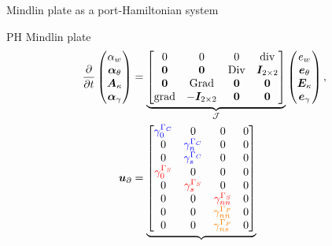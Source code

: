 \documentclass[aspectratio=169]{ISAE-Beamer}
\DeclareMathOperator*{\grad}{grad}
\DeclareMathOperator*{\Grad}{Grad}
\DeclareMathOperator*{\Div}{Div}
\renewcommand{\div}{\operatorname{div}}
\begin{document}
\begin{frame}{Mindlin plate as a port-Hamiltonian system}
	\begin{block}{PH Mindlin plate}
		\small
		\setlength{\abovedisplayskip}{1pt}
		\setlength{\belowdisplayskip}{1pt}
		\begin{equation*}
		\begin{aligned}
		\displaystyle
		\diffp{}{t}
		\begin{pmatrix}
		\alpha_w \\
		\bm\alpha_\theta \\
		\bm{A}_\kappa \\
		\bm\alpha_{\gamma} \\
		\end{pmatrix} &= 
		\underbrace{\begin{bmatrix}
			0  & 0  & 0  & \div \\
			\bm{0} & \bm{0} &  \Div & \bm{I}_{2 \times 2}\\
			\bm{0}  & \Grad  & \bm{0}  & \bm{0}\\
			\grad & -\bm{I}_{2 \times 2} &  \bm{0} & \bm{0} \\
			\end{bmatrix}}_{\mathcal{J}}
		\begin{pmatrix}
		e_w \\
		\bm{e}_{\theta} \\
		\bm{E}_{\kappa} \\
		\bm{e}_{\gamma} \\
		\end{pmatrix}, \vspace{3pt}\\
		\bm{u}_\partial &= \underbrace{
			\begin{bmatrix}
			\textcolor{blue}{\gamma_{0}^{\Gamma_C}} & {0} & {0} & {0} \\
			{0} & \textcolor{blue}{\gamma_n^{\Gamma_C}} &  {0} & {0} \\
			{0} & \textcolor{blue}{\gamma_s^{\Gamma_C}} &  {0} & {0} \\
			\textcolor{red}{\gamma_{0}^{\Gamma_S}} & {0} & {0} & {0} \\
			{0} & \textcolor{red}{\gamma_s^{\Gamma_S}} & {0} & {0} \\
			{0} &  {0} & \textcolor{red}{\gamma_{nn}^{\Gamma_S}} & {0} \\
			{0} &  {0} & \textcolor{orange}{\gamma_{nn}^{\Gamma_F}} & {0} \\
			{0} &  {0} & \textcolor{orange}{\gamma_{ns}^{\Gamma_F}} & {0} \\

\end{bmatrix}}
\end{aligned}
\end{equation*}
\end{block}
\end{frame}
\end{document}
